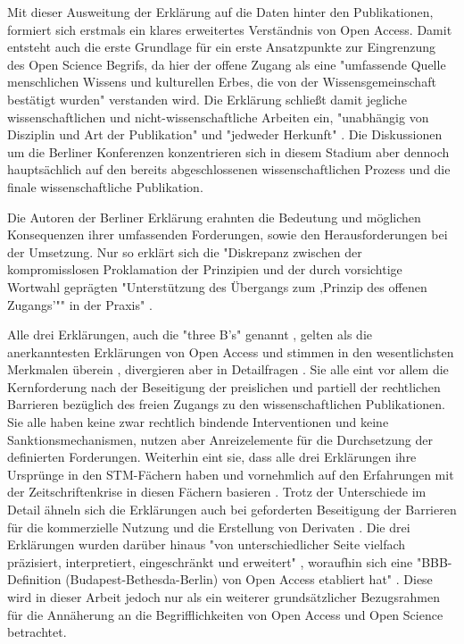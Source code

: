\begin{enumerate}
Mit dieser Ausweitung der Erklärung auf die Daten hinter den Publikationen, formiert sich erstmals ein klares erweitertes Verständnis von Open Access. Damit entsteht auch die erste Grundlage für ein erste Ansatzpunkte zur Eingrenzung des Open Science Begrifs, da hier der offene Zugang als eine "umfassende Quelle menschlichen Wissens und kulturellen Erbes, die von der Wissensgemeinschaft bestätigt wurden" \cite{berliner_erklaerung_2003} verstanden wird. Die Erklärung schließt damit jegliche wissenschaftlichen und nicht-wissenschaftliche Arbeiten ein, "unabhängig von Disziplin und Art der Publikation" und "jedweder Herkunft" \cite{naeder_2010_open}. Die Diskussionen um die Berliner Konferenzen konzentrieren sich in diesem Stadium aber dennoch hauptsächlich auf den bereits abgeschlossenen wissenschaftlichen Prozess und die finale wissenschaftliche Publikation.

Die Autoren der Berliner Erklärung erahnten die Bedeutung und möglichen Konsequenzen ihrer umfassenden Forderungen, sowie den Herausforderungen bei der Umsetzung. Nur so erklärt sich die "Diskrepanz zwischen der kompromisslosen Proklamation der Prinzipien und der durch vorsichtige Wortwahl geprägten "Unterstützung des Übergangs zum ‚Prinzip des offenen Zugangs’"" in der Praxis" \cite{Lossau_oa_2007}.
\end{enumerate}

Alle drei Erklärungen, auch die "three B's" genannt \cite{suber_2004_praising_oa}, gelten als die anerkanntesten Erklärungen von Open Access und stimmen in den wesentlichsten Merkmalen überein \cite{albert_2006_open_implications}, divergieren aber in Detailfragen \cite{naeder_2010_open}. Sie alle eint vor allem die Kernforderung nach der Beseitigung der preislichen und partiell der rechtlichen Barrieren bezüglich des freien Zugangs zu den wissenschaftlichen Publikationen. Sie alle haben keine zwar rechtlich bindende Interventionen und keine Sanktionsmechanismen, nutzen aber Anreizelemente für die Durchsetzung der definierten Forderungen. Weiterhin eint sie, dass alle drei Erklärungen ihre Ursprünge in den STM-Fächern haben und vornehmlich auf den Erfahrungen mit der Zeitschriftenkrise in diesen Fächern basieren \cite{naeder_2010_open}. Trotz der Unterschiede im Detail ähneln sich die Erklärungen auch bei geforderten Beseitigung der Barrieren für die kommerzielle Nutzung und die Erstellung von Derivaten \cite{CREATe_2014}. Die drei Erklärungen wurden darüber hinaus "von unterschiedlicher Seite vielfach präzisiert, interpretiert, eingeschränkt und erweitert" \cite{naeder_2010_open}, woraufhin sich eine "BBB-
Definition (Budapest-Bethesda-Berlin) von Open Access etabliert hat" \cite{Schirmbacher_oa_2007}. Diese wird in dieser Arbeit jedoch nur als ein weiterer grundsätzlicher Bezugsrahmen für die Annäherung an die Begrifflichkeiten von Open Access und Open Science betrachtet.

